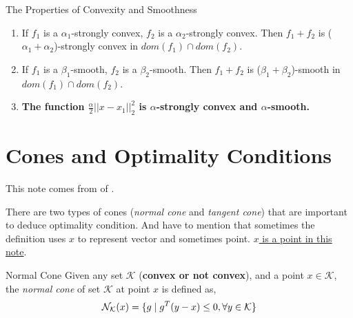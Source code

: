		 \begin{Properties}{The Properties of Convexity and Smoothness}{}
		 	\begin{enumerate}
			 	\item If $f_1$ is a $\alpha_1$-strongly convex, $f_2$ is a $\alpha_2$-strongly convex. Then $f_1+f_2$ is ($\alpha_1+\alpha_2$)-strongly convex in $dom(f_1)\cap dom(f_2)$. 
			 	\item If $f_1$ is a $\beta_1$-smooth, $f_2$ is a $\beta_2$-smooth. Then $f_1+f_2$ is ($\beta_1+\beta_2$)-smooth in $dom(f_1)\cap dom(f_2)$.
			 	\item \textbf{The function $\frac{\alpha}{2}||x-x_1||^2_2$ is $\alpha$-strongly convex and $\alpha$-smooth.}
		 	\end{enumerate}
		 \end{Properties}
		 
	\section{Cones and Optimality Conditions} \label{Cones and Optimality Conditions}
	 This note comes from  of \cite{gormley2023introductiononlineconvexoptimization}.
	 
	 There are two types of cones (\emph{normal cone} and \emph{tangent cone}) that are important to deduce optimality condition. And have to mention that sometimes the definition uses $x$ to represent vector and sometimes point. \underline{$x$ is a point in this note}.
	 
	 \begin{defn}{Normal Cone}{}
	 	Given any set $\mathcal{K}$ (\textbf{convex or not convex}), and a point $x\in \mathcal{K}$, the \emph{normal cone} of set $\mathcal{K}$ at point $x$ is defined as,
	 	$$
	 	\mathcal{N}_{\mathcal{K}}(x) =\{g \mid g^T(y-x)\le0, \forall y\in \mathcal{K}\}
	 	$$
	 \end{defn}
 		
